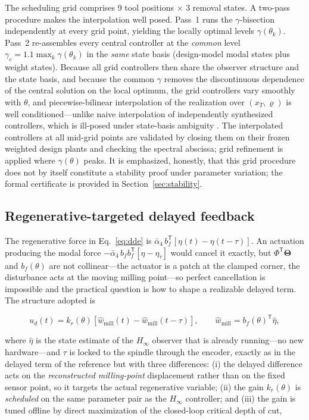 \documentclass[preprint,12pt]{elsarticle}
\newcommand{\whmill}{\hat{w}_{\mathrm{mill}}}
\newcommand{\hinf}{H_\infty}
\newcommand{\T}{\mathsf{T}}
\begin{document}
The scheduling grid comprises 9 tool positions $\times$ 3 removal
states. A two-pass procedure makes the interpolation well posed. Pass~1
runs the $\gamma$-bisection independently at every grid point, yielding
the locally optimal levels $\gamma(\theta_k)$. Pass~2 re-assembles every
central controller at the \emph{common} level
$\gamma_c = 1.1 \max_k \gamma(\theta_k)$ in the \emph{same} state basis
(design-model modal states plus weight states). Because all grid
controllers then share the observer structure and the state basis, and
because the common $\gamma$ removes the discontinuous dependence of the
central solution on the local optimum, the grid controllers vary
smoothly with $\theta$, and piecewise-bilinear interpolation of the
realization over $(x_T, \varrho)$ is well conditioned---unlike naive
interpolation of independently synthesized controllers, which is
ill-posed under state-basis ambiguity \cite{rugh2000research}. The
interpolated controllers at all mid-grid points are validated by closing
them on their frozen weighted design plants and checking the spectral
abscissa; grid refinement is applied where $\gamma(\theta)$ peaks. It is
emphasized, honestly, that this grid procedure does not by itself
constitute a stability proof under parameter variation; the formal
certificate is provided in Section~\ref{sec:stability}.

\subsection{Regenerative-targeted delayed feedback}
\label{sec:delayed}

The regenerative force in Eq.~\eqref{eq:dde} is
$\bar{\alpha}_4\, b_f^{\T} [\eta(t) - \eta(t - \tau)]$. An actuation
producing the modal force
$-\bar{\alpha}_4\, b_f b_f^{\T} [\eta - \eta_\tau]$ would cancel it
exactly, but $\Phi^{\T} \boldsymbol{\Theta}$ and $b_f(\theta)$ are not
collinear---the actuator is a patch at the clamped corner, the
disturbance acts at the moving milling point---so perfect cancellation
is impossible and the practical question is how to shape a realizable
delayed term. The structure adopted is

\begin{equation}
\label{eq:ud}
u_d(t) = k_r(\theta) \left[ \whmill(t) - \whmill(t - \tau) \right],
\qquad
\whmill = b_f(\theta)^{\T} \hat{\eta},
\end{equation}

where $\hat{\eta}$ is the state estimate of the $\hinf$ observer that is
already running---no new hardware---and $\tau$ is locked to the spindle
through the encoder, exactly as in the delayed term of the reference
\cite{du2024robust} but with three differences: (i) the delayed
difference acts on the \emph{reconstructed milling-point} displacement
rather than on the fixed sensor point, so it targets the actual
regenerative variable; (ii) the gain $k_r(\theta)$ is \emph{scheduled}
on the same parameter pair as the $\hinf$ controller; and (iii) the gain
is tuned offline by direct maximization of the closed-loop critical
depth of cut,
\end{document}
